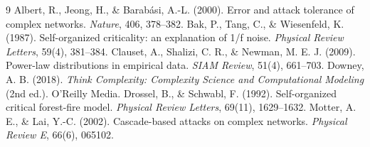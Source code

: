 \documentclass[11pt,a4paper]{article}
\begin{document}
\begin{thebibliography}{9}
\small
{} Albert, R., Jeong, H., \& Barab\'{a}si, A.-L. (2000).
Error and attack tolerance of complex networks. \emph{Nature}, 406, 378--382.
 Bak, P., Tang, C., \& Wiesenfeld, K. (1987). Self-organized
criticality: an explanation of 1/f noise. \emph{Physical Review Letters},
59(4), 381--384.
 Clauset, A., Shalizi, C. R., \& Newman, M. E. J. (2009).
Power-law distributions in empirical data. \emph{SIAM Review}, 51(4), 661--703.
 Downey, A. B. (2018). \emph{Think Complexity: Complexity
Science and Computational Modeling} (2nd ed.). O'Reilly Media.
 Drossel, B., \& Schwabl, F. (1992). Self-organized
critical forest-fire model. \emph{Physical Review Letters}, 69(11), 1629--1632.
 Motter, A. E., \& Lai, Y.-C. (2002). Cascade-based attacks
on complex networks. \emph{Physical Review E}, 66(6), 065102.
\end{thebibliography}
\end{document}
